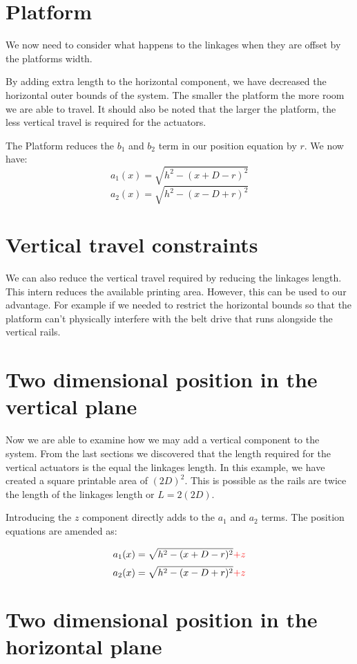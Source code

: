 \documentclass[a4paper, 11pt, twoside]{Thesis}  %
\begin{document}
\section{Platform}

We now need to consider what happens to the linkages when they are offset by the platforms width.



By adding extra length to the horizontal component, we have decreased the horizontal outer bounds of the system. The smaller the platform the more room we are able to travel. It should also be noted that the larger the platform, the less vertical travel is required for the actuators.

The Platform reduces the $b_1$ and $b_2$ term in our position equation by $r$. We now have:
$$ a_1(x) = \sqrt{ h^2 - (x + D - r)^2 }$$
$$ a_2(x) = \sqrt{ h^2 - (x - D + r)^2 } $$
\section{Vertical travel constraints}

We can also reduce the vertical travel required by reducing the linkages length. This intern reduces the available printing area. However, this can be used to our advantage. For example if we needed to restrict the horizontal bounds so that the platform can't physically interfere with the belt drive that runs alongside the vertical rails.


\section{Two dimensional position in the vertical plane}

Now we are able to examine how we may add a vertical component to the system. From the last sections we discovered that the length required for the vertical actuators is the equal the linkages length. In this example, we have created a square printable area of $(2D)^2$. This is possible as the rails are twice the length of the linkages length or $L = 2(2D)$. 



Introducing the $z$ component directly adds to the $a_1$ and $a_2$ terms. The position equations are amended as:

$$ a_1(x) = \sqrt{ h^2 - (x + D - r)^2 } \color{red}{ + z}$$
$$ a_2(x) = \sqrt{ h^2 - (x - D + r)^2 } \color{red}{ + z}$$
\section{Two dimensional position in the horizontal plane}
\end{document}
